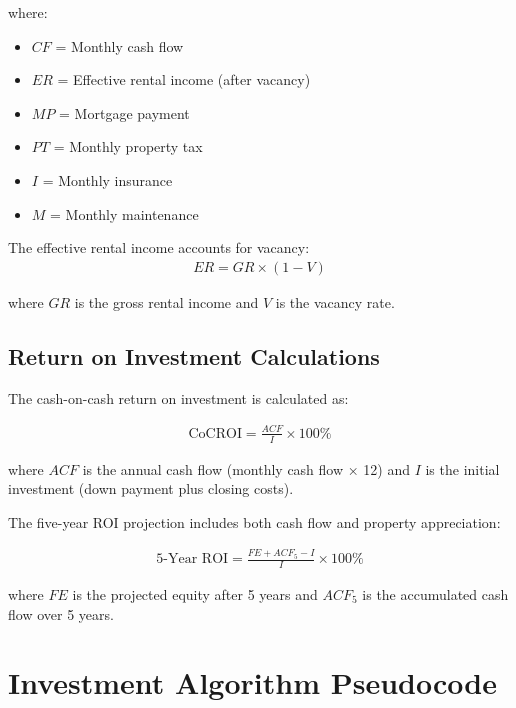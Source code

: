 \documentclass[conference]{IEEEtran}
\begin{document}
where:
\begin{itemize}
\item $CF$ = Monthly cash flow
\item $ER$ = Effective rental income (after vacancy)
\item $MP$ = Mortgage payment
\item $PT$ = Monthly property tax
\item $I$ = Monthly insurance
\item $M$ = Monthly maintenance
\end{itemize}

The effective rental income accounts for vacancy:
\begin{align}
ER = GR \times (1 - V)
\end{align}

where $GR$ is the gross rental income and $V$ is the vacancy rate.

\subsection{Return on Investment Calculations}
The cash-on-cash return on investment is calculated as:

\begin{align}
\text{CoCROI} = \frac{ACF}{I} \times 100\%
\end{align}

where $ACF$ is the annual cash flow (monthly cash flow × 12) and $I$ is the initial investment (down payment plus closing costs).

The five-year ROI projection includes both cash flow and property appreciation:

\begin{align}
\text{5-Year ROI} = \frac{FE + ACF_5 - I}{I} \times 100\%
\end{align}

where $FE$ is the projected equity after 5 years and $ACF_5$ is the accumulated cash flow over 5 years.

\section{Investment Algorithm Pseudocode}
\end{document}
